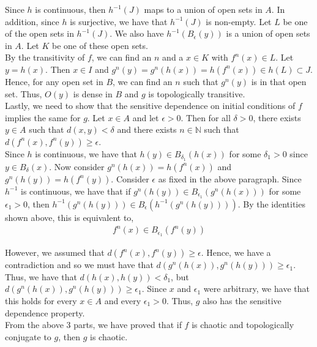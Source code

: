 \documentclass[12pt]{article}
\begin{document}
Since $h$ is continuous, then $h^{-1}(J)$ maps to a union of open sets in $A$. In addition, since $h$ is surjective, we have that $h^{-1}(J)$ is non-empty. Let $L$ be one of the open sets in $h^{-1}(J)$. We also have $h^{-1}(B_{\epsilon}(y))$ is a union of open sets in $A$. Let $K$ be one of these open sets.\\

By the transitivity of $f$, we can find an $n$ and a $x \in K$ with $f^n(x) \in L$. Let $y = h(x)$. Then $x \in I$ and $g^n(y) = g^n(h(x)) = h(f^n(x)) \in h(L) \subset J$.\\

Hence, for any open set in $B$, we can find an $n$ such that $g^n(y)$ is in that open set. Thus, $O(y)$ is dense in $B$ and $g$ is topologically transitive.\\

Lastly, we need to show that the sensitive dependence on initial conditions of $f$ implies the same for $g$. Let $x \in A$ and let $\epsilon > 0$. Then for all $\delta > 0$, there exists $y \in A$ such that $d(x, y) < \delta$ and there exists $n \in \mathbb{N}$ such that $d(f^n(x), f^n(y)) \geq \epsilon$.\\

Since $h$ is continuous, we have that $h(y) \in B_{\delta_1}(h(x))$ for some $\delta_1 > 0$ since $y \in B_{\delta}(x)$. Now consider $g^n(h(x)) = h(f^n(x))$ and $g^n(h(y)) = h(f^n(y))$. Consider $\epsilon$ as fixed in the above paragraph. Since $h^{-1}$ is continuous, we have that if $g^n(h(y)) \in B_{\epsilon_1}(g^n(h(x)))$ for some $\epsilon_1 > 0$, then $h^{-1}(g^n(h(y))) \in B_{\epsilon}(h^{-1}(g^n(h(y))))$. By the identities shown above, this is equivalent to,
\begin{align*}
f^n(x) \in B_{\epsilon_1}(f^n(y))
\end{align*}

However, we assumed that $d(f^n(x), f^n(y)) \geq \epsilon$. Hence, we have a contradiction and so we must have that $d(g^n(h(x)), g^n(h(y))) \geq \epsilon_1$. Thus, we have that $d(h(x), h(y)) < \delta_1$, but $d(g^n(h(x)), g^n(h(y))) \geq \epsilon_1$. Since $x$ and $\epsilon_1$ were arbitrary, we have that this holds for every $x \in A$ and every $\epsilon_1 > 0$. Thus, $g$ also has the sensitive dependence property.\\

From the above 3 parts, we have proved that if $f$ is chaotic and topologically conjugate to $g$, then $g$ is chaotic.\\
\end{document}
